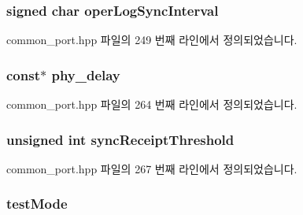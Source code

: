 \subsubsection[{\texorpdfstring{oper\+Log\+Sync\+Interval}{operLogSyncInterval}}]{\setlength{\rightskip}{0pt plus 5cm}signed char oper\+Log\+Sync\+Interval}\hypertarget{struct_port_init__t_a5b06dd259daf4e1dd5c6b8d15f9bcabf}{}\label{struct_port_init__t_a5b06dd259daf4e1dd5c6b8d15f9bcabf}


common\+\_\+port.\+hpp 파일의 249 번째 라인에서 정의되었습니다.

\subsubsection[{\texorpdfstring{phy\+\_\+delay}{phy_delay}}]{ const$\ast$ phy\+\_\+delay}\hypertarget{struct_port_init__t_a58af31938106f0270af088b7e552d125}{}\label{struct_port_init__t_a58af31938106f0270af088b7e552d125}


common\+\_\+port.\+hpp 파일의 264 번째 라인에서 정의되었습니다.

\subsubsection[{\texorpdfstring{sync\+Receipt\+Threshold}{syncReceiptThreshold}}]{\setlength{\rightskip}{0pt plus 5cm}unsigned int sync\+Receipt\+Threshold}\hypertarget{struct_port_init__t_a503c299642c8353010c3421808b23dc9}{}\label{struct_port_init__t_a503c299642c8353010c3421808b23dc9}


common\+\_\+port.\+hpp 파일의 267 번째 라인에서 정의되었습니다.

\subsubsection[{\texorpdfstring{test\+Mode}{testMode}}]{ test\+Mode}\hypertarget{struct_port_init__t_a4ca1649b0fc050ca483e5dd8996ac80d}{}\label{struct_port_init__t_a4ca1649b0fc050ca483e5dd8996ac80d}



